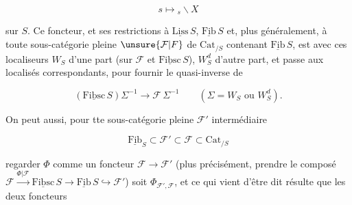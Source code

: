\[
s\longmapsto {}_s\backslash X
\]

sur $S$. Ce foncteur, et ses restrictions à $\underline{\mathrm{Liss}}\,S$, $\underline{\mathrm{Fib}}\,S$ et, plus généralement, à toute sous-catégorie pleine $\unsure{\mathcal{F}|F}$ de $\mathrm{Cat}_{/S}$ contenant $\underline{\mathrm{Fib}}\,S$,  est  avec ces localiseurs $W_S$ d'une part (sur $\mathcal{F}$ et $\underline{\mathrm{Fibsc}}\,S$), $W_S^d$ d'autre part, et passe  aux localisés correspondants, pour fournir le quasi-inverse  de

\[
(\underline{\mathrm{Fibsc}}\,S)\Sigma^{-1}\longrightarrow\mathcal{F}\,\Sigma^{-1}
\qquad(\Sigma=W_S\text{ ou }W_S^d).
\]

On peut aussi, pour tte sous-catégorie pleine $\mathcal{F}'$ intermédiaire

\[
\underline{\mathrm{Fib}}_S\subset\mathcal{F}'\subset\mathcal{F}\subset\mathrm{Cat}_{/S}
\]

regarder $\Phi$ comme un foncteur $\mathcal{F}\longrightarrow\mathcal{F}'$ (plus précisément, prendre le composé $\mathcal{F}\xrightarrow{\Phi|\mathcal{F}}\underline{\mathrm{Fibsc}}\,S\longrightarrow\underline{\mathrm{Fib}}\,S\hookrightarrow\mathcal{F}'$) soit $\Phi_{\mathcal{F}',\mathcal{F}}$, et  ce qui vient d'être dit résulte que les deux foncteurs

